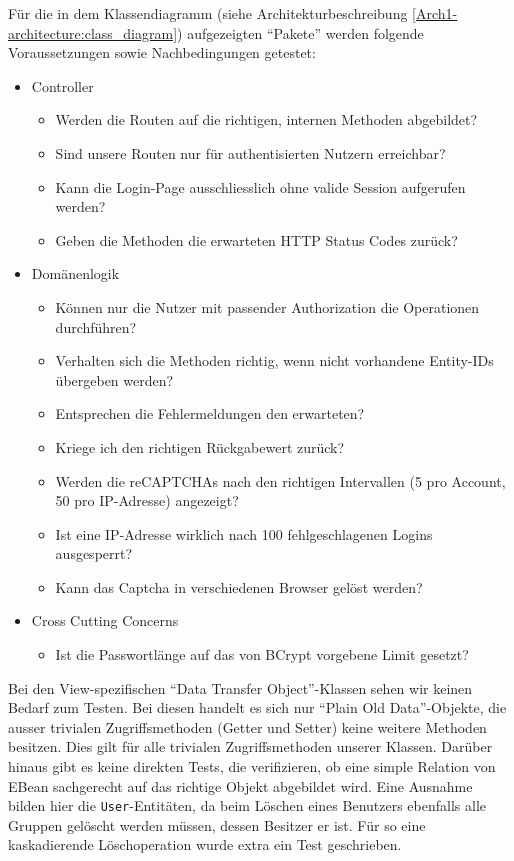 \documentclass[12pt,DIV14,BCOR10mm,a4paper,parskip=half-,headsepline,headinclude,english,ngerman,bibliography=totocnumbered]{scrreprt}
\begin{document}

Für die in dem Klassendiagramm (siehe Architekturbeschreibung \ref{Arch1-architecture:class_diagram}) aufgezeigten \enquote{Pakete} werden folgende Voraussetzungen sowie Nachbedingungen getestet:

\begin{itemize}
  \item Controller
  \begin{itemize}
    \item Werden die Routen auf die richtigen, internen Methoden abgebildet?
    \item Sind unsere Routen nur für authentisierten Nutzern erreichbar?
    \item Kann die Login-Page ausschliesslich ohne valide Session aufgerufen werden?
    \item Geben die Methoden die erwarteten HTTP Status Codes zurück?
  \end{itemize}

  \item Domänenlogik
  \begin{itemize}
    \item Können nur die Nutzer mit passender Authorization die Operationen durchführen?
    \item Verhalten sich die Methoden richtig, wenn nicht vorhandene Entity-IDs übergeben werden?
    \item Entsprechen die Fehlermeldungen den erwarteten?
    \item Kriege ich den richtigen Rückgabewert zurück?
    \item Werden die reCAPTCHAs nach den richtigen Intervallen (5 pro Account, 50 pro IP-Adresse) angezeigt?
    \item Ist eine IP-Adresse wirklich nach 100 fehlgeschlagenen Logins ausgesperrt?
    \item Kann das Captcha in verschiedenen Browser gelöst werden?
  \end{itemize}

  \item Cross Cutting Concerns
  \begin{itemize}
    \item Ist die Passwortlänge auf das von BCrypt vorgebene Limit gesetzt?
  \end{itemize}
\end{itemize}

Bei den View-spezifischen \enquote{Data Transfer Object}-Klassen sehen wir keinen Bedarf zum Testen.
Bei diesen handelt es sich nur \enquote{Plain Old Data}-Objekte, die ausser trivialen Zugriffsmethoden (Getter und Setter) keine weitere Methoden besitzen.
Dies gilt für alle trivialen Zugriffsmethoden unserer Klassen. \newline
Darüber hinaus gibt es keine direkten Tests, die verifizieren, ob eine simple Relation von EBean sachgerecht auf das richtige Objekt abgebildet wird.
Eine Ausnahme bilden hier die \texttt{User}-Entitäten, da beim Löschen eines Benutzers ebenfalls alle Gruppen gelöscht werden müssen, dessen Besitzer er ist. Für so eine kaskadierende Löschoperation wurde extra ein Test geschrieben.
\end{document}
